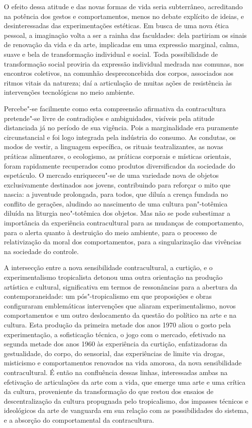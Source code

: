 O efeito dessa atitude e das novas formas de vida seria subterrâneo,
acreditando na potência dos gestos e comportamentos, menos no debate
explícito de ideias, e desinteressadas das experimentações estéticas. Em
busca de uma nova ética pessoal, a imaginação volta a ser a rainha das
faculdades: dela partiriam os sinais de renovação da vida e da arte,
implicadas em uma expressão marginal, calma, suave e bela de
transformação individual e social. Toda possibilidade de transformação
social proviria da expressão individual medrada nas comunas, nos
encontros coletivos, na comunhão despreconcebida dos corpos, associados
aos ritmos vitais da natureza; daí a articulação de muitas ações de
resistência às intervenções tecnológicas no meio ambiente.

Percebe"-se facilmente como esta compreensão afirmativa da contracultura
pretende"-se livre de contradições e ambiguidades, visíveis pela atitude
distanciada já no período de sua vigência. Pois a marginalidade era
puramente circunstancial e foi logo integrada pela indústria do consumo.
As condutas, os modos de vestir, a linguagem específica, os rituais
teatralizantes, as novas práticas alimentares, o ecologismo, as práticas
corporais e místicas orientais, foram rapidamente recuperados como
produtos diversificados da sociedade do espetáculo. O mercado
enriqueceu"-se de uma variedade nova de objetos exclusivamente destinados
aos jovens, contribuindo para reforçar o mito que nascia: a juventude
prolongada, para todos, que diluía a crença fundada no conflito de
gerações, aludindo ao nascimento de uma cultura pan"-totêmica diluída na
liturgia neo"-totêmica dos objetos. Mas não se pode subestimar a
importância da experiência contracultural para as mudanças de
comportamento, para o alerta quanto à destruição do meio ambiente, para
o processo de relativização da moral dos comportamentos, para a
singularização das vivências na sociedade do controle.

\asterisc

A intersecção entre a nova sensibilidade contracultural, a curtição, e o
experimentalismo tropicalista detonou uma outra orientação na produção
artística e cultural, significativa em termos de ressonâncias para a
abertura da contemporaneidade: um pós"-tropicalismo em que proposições e
obras configuraram emblemáticas intervenções que aliaram
experimentalismo, novos comportamentos e um outro deslocamento da
questão do político na arte e na cultura. Esta produção da primeira
metade dos anos 1970 aliou o gosto pela experimentação, a sofisticação
técnica, o jogo com o mercado, efetivado na segunda metade dos anos 1960
às experiência da curtição, enfatizadoras da gestualidade, do corpo, do
sensorial, das experiências de limite via drogas, misticismo e
comportamentos renovados na vida amorosa, da nova sensibilidade
contracultural. É então na confluência dessas linhas, interessadas ambas
na efetivação de articulações da arte com a vida, que emerge uma arte e
uma crítica da cultura, proveniente da transformação do que restou dos
ensaios de descentralização da cultura propugnada pelo tropicalismo, dos
impasses técnicos e ideológicos da arte de vanguarda em sua relação com
as possibilidades do sistema, e a absorção do comportamental da
contracultura.

